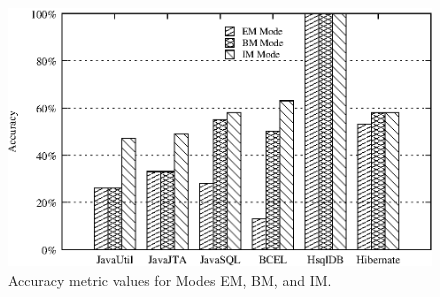 \begin{figure}[t]
\centering
\includegraphics[scale=0.70,clip]{figs/Alattin_Accuracy.eps}\vspace*{-1ex}
\caption{Accuracy metric values for Modes EM, BM, and IM.} \label{fig:accuracy}\vspace*{-4ex}
\end{figure}

